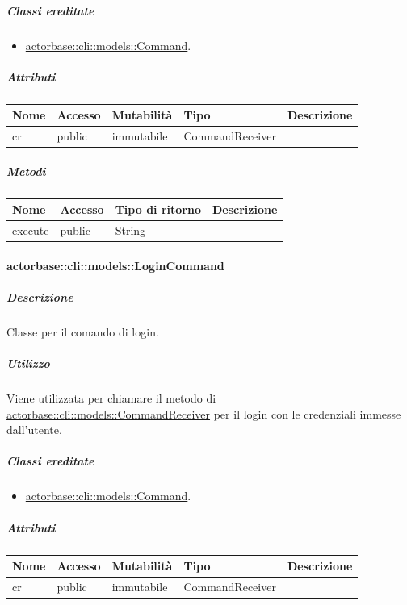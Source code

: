 \documentclass{scalatekids-article}
\begin{document}
\subparagraph{Classi ereditate}

\begin{itemize}
\item \hyperref[sec:actorbase::cli::models::Command]{actorbase::cli::models::Command}.
\end{itemize}

\subparagraph{Attributi}

\begin{tabular}{| l | l | l | l | l |}
  \hline
  Nome & Accesso & Mutabilità & Tipo & Descrizione\\
  \hline
  cr & public & immutabile & CommandReceiver & \\
  \hline
\end{tabular}

\subparagraph{Metodi}

\begin{tabular}{| l | l | l | l |}
  \hline
  Nome & Accesso & Tipo di ritorno & Descrizione\\
  \hline
  execute & public & String & \\
  \hline
\end{tabular}

\paragraph{actorbase::cli::models::LoginCommand}
\label{sec:actorbase::cli::models::LoginCommand}

\subparagraph{Descrizione}

Classe per il comando di login.

\subparagraph{Utilizzo}

Viene utilizzata per chiamare il metodo di
\hyperref[sec:actorbase::cli::models::CommandReceiver]{actorbase::cli::models::CommandReceiver} per il login con le credenziali
immesse dall'utente.

\subparagraph{Classi ereditate}

\begin{itemize}
\item \hyperref[sec:actorbase::cli::models::Command]{actorbase::cli::models::Command}.
\end{itemize}

\subparagraph{Attributi}

\begin{tabular}{| l | l | l | l | l |}
  \hline
  Nome & Accesso & Mutabilità & Tipo & Descrizione\\
  \hline
  cr & public & immutabile & CommandReceiver & \\
  \hline
\end{tabular}
\end{document}
